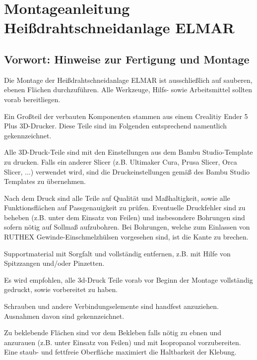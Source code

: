%
%

\chapter{Montageanleitung Heißdrahtschneidanlage \glqq ELMAR\grqq}


\section{Vorwort: Hinweise zur Fertigung und Montage}

Die Montage der Heißdrahtschneidanlage \glqq ELMAR\grqq{} ist ausschließlich auf sauberen, ebenen Flächen durchzuführen. Alle Werkzeuge, Hilfs- sowie Arbeitsmittel sollten vorab bereitliegen.

Ein Großteil der verbauten Komponenten stammen aus einem Crealitiy Ender 5 Plus 3D-Drucker. Diese Teile sind im Folgenden entsprechend namentlich gekennzeichnet.

Alle 3D-Druck-Teile sind mit den Einstellungen aus dem Bambu Studio-Template zu drucken. Falls ein anderer Slicer (z.B. Ultimaker Cura, Prusa Slicer, Orca Slicer, ...) verwendet wird, sind die Druckeinstellungen gemäß des Bambu Studio Templates zu übernehmen.

Nach dem Druck sind alle Teile auf Qualität und Maßhaltigkeit, sowie alle Funktionsflächen auf Passgenauigkeit zu prüfen. Eventuelle Druckfehler sind zu beheben (z.B. unter dem Einsatz von Feilen) und insbesondere Bohrungen sind sofern nötig auf Sollmaß aufzubohren. Bei Bohrungen, welche zum Einlassen von RUTHEX Gewinde-Einschmelzhülsen vorgesehen sind, ist die Kante zu brechen.

Supportmaterial mit Sorgfalt und vollständig entfernen, z.B. mit Hilfe von Spitzzangen und/oder Pinzetten.

Es wird empfohlen, alle 3d-Druck Teile vorab vor Beginn der Montage vollständig gedruckt, sowie vorbereitet zu haben.

Schrauben und andere Verbindungselemente sind handfest anzuziehen. Ausnahmen davon sind gekennzeichnet.

Zu beklebende Flächen sind vor dem Bekleben falls nötig zu ebnen und anzurauen (z.B. unter Einsatz von Feilen) und mit Isopropanol vorzubereiten. Eine staub- und fettfreie Oberfläche maximiert die Haltbarkeit der Klebung.

